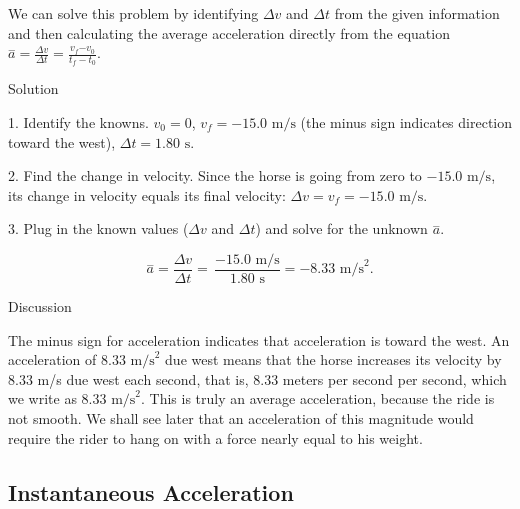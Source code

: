 \documentclass[
]{book}
\begin{document}
We can solve this problem by identifying \({\Delta v}{}\) and
\({\Delta t}{}\) from the given information and then calculating the
average acceleration directly from the equation
\({{\overset{-}{a} = \frac{\Delta v}{\Delta t}} = \frac{v_{f}{- v_{0}}}{t_{f} - t_{0}}}{}\).

{Solution}

1. Identify the knowns. \({v_{0} = 0}{}\),
\({v_{f} = {- \text{15}}}\text{.0\ m/s}\) (the minus sign indicates
direction toward the west), \({{\Delta t = 1}\text{.80\ s}}{}\).

2. Find the change in velocity. Since the horse is going from zero to
\({- \text{15.0\ m/s}}{}\), its change in velocity equals its final
velocity: \({{{\Delta v = v_{f}} = {- \text{15}}}\text{.0\ m/s}}{}\).

3. Plug in the known values (\({\Delta v}{}\) and \(\Delta t\)) and solve
for the unknown \(\overset{-}{a}{}\).

\leavevmode{}%
\[{{{{{\overset{-}{a} = \frac{\Delta v}{\Delta t}} = \,\frac{{- \text{15}}\text{.0\ m/s}}{1\text{.80\ s}}} = {- 8}}\text{.33\ m}\text{/s}^{2}}.}{}\]

{Discussion}

The minus sign for acceleration indicates that acceleration is toward
the west. An acceleration of \({8\text{.33\ m}\text{/s}^{2}}{}\) due west
means that the horse increases its velocity by 8.33 m/s due west each
second, that is, 8.33 meters per second per second, which we write as
\({8\text{.33\ m}\text{/s}^{2}}{}\). This is truly an average
acceleration, because the ride is not smooth. We shall see later that an
acceleration of this magnitude would require the rider to hang on with a
force nearly equal to his weight.

\hypertarget{fs-id1759915}{}
\hypertarget{instantaneous-acceleration}{%
\subsection{Instantaneous Acceleration}\label{instantaneous-acceleration}}
\end{document}
